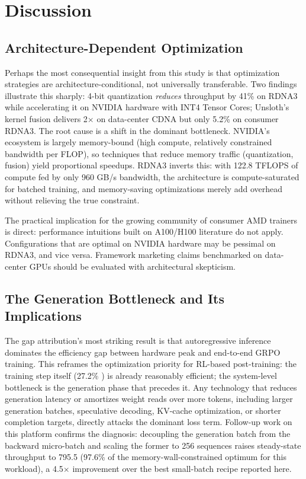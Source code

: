 \section{Discussion}
\label{sec:discussion}

\subsection{Architecture-Dependent Optimization}

Perhaps the most consequential insight from this study is that optimization strategies are architecture-conditional, not universally transferable. Two findings illustrate this sharply: 4-bit quantization \emph{reduces} throughput by 41\% on RDNA3 while accelerating it on NVIDIA hardware with INT4 Tensor Cores; Unsloth's kernel fusion delivers 2$\times$ on data-center CDNA but only 5.2\% on consumer RDNA3. The root cause is a shift in the dominant bottleneck. NVIDIA's ecosystem is largely memory-bound (high compute, relatively constrained bandwidth per FLOP), so techniques that reduce memory traffic (quantization, fusion) yield proportional speedups. RDNA3 inverts this: with 122.8 TFLOPS of compute fed by only 960 GB/s bandwidth, the architecture is compute-saturated for batched training, and memory-saving optimizations merely add overhead without relieving the true constraint.

The practical implication for the growing community of consumer AMD trainers is direct: performance intuitions built on A100/H100 literature do not apply. Configurations that are optimal on NVIDIA hardware may be pessimal on RDNA3, and vice versa. Framework marketing claims benchmarked on data-center GPUs should be evaluated with architectural skepticism.

\subsection{The Generation Bottleneck and Its Implications}

The gap attribution's most striking result is that autoregressive inference dominates the efficiency gap between hardware peak and end-to-end GRPO training. This reframes the optimization priority for RL-based post-training: the training step itself (27.2\% \mfuprac{}) is already reasonably efficient; the system-level bottleneck is the generation phase that precedes it. Any technology that reduces generation latency or amortizes weight reads over more tokens, including larger generation batches, speculative decoding, KV-cache optimization, or shorter completion targets, directly attacks the dominant loss term. Follow-up work on this platform confirms the diagnosis: decoupling the generation batch from the backward micro-batch and scaling the former to 256 sequences raises steady-state throughput to 795.5 \toksec{} (97.6\% of the memory-wall-constrained optimum for this workload), a 4.5$\times$ improvement over the best small-batch recipe reported here.

